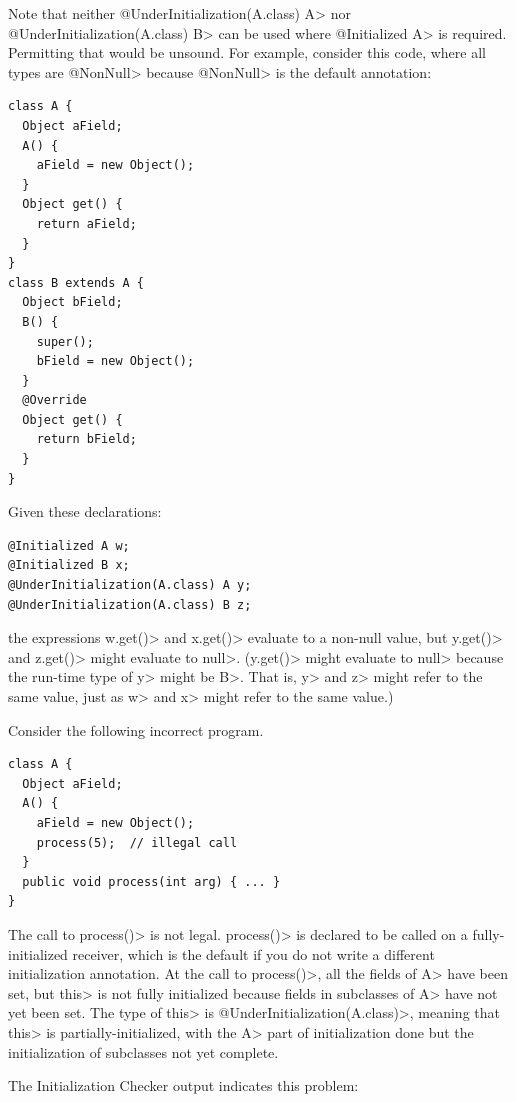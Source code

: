 Note that neither \<@UnderInitialization(A.class) A> nor
\<@UnderInitialization(A.class) B> can be used where \<@Initialized A> is
required.  Permitting that would be unsound.  For example, consider this
code, where all types are \<@NonNull> because \<@NonNull> is the default annotation:

\begin{Verbatim}
class A {
  Object aField;
  A() {
    aField = new Object();
  }
  Object get() {
    return aField;
  }
}
class B extends A {
  Object bField;
  B() {
    super();
    bField = new Object();
  }
  @Override
  Object get() {
    return bField;
  }
}
\end{Verbatim}

Given these declarations:

\begin{Verbatim}
@Initialized A w;
@Initialized B x;
@UnderInitialization(A.class) A y;
@UnderInitialization(A.class) B z;
\end{Verbatim}

\noindent
the expressions \<w.get()> and \<x.get()> evaluate to a non-null value, but
\<y.get()> and \<z.get()> might evaluate to \<null>.
(\<y.get()> might evaluate to \<null> because the run-time type of \<y>
might be \<B>.  That is, \<y> and \<z> might refer to the same value, just
as \<w> and \<x> might refer to the same value.)



Consider the following incorrect program.

\begin{Verbatim}
class A {
  Object aField;
  A() {
    aField = new Object();
    process(5);  // illegal call
  }
  public void process(int arg) { ... }
}
\end{Verbatim}

The call to \<process()> is not legal.
\<process()> is declared to be called on a fully-initialized receiver, which is
the default if you do not write a different initialization annotation.
At the call to \<process()>, all the fields of \<A> have been set,
but \<this> is not fully initialized because fields in subclasses of \<A> have
not yet been set.  The type of \<this> is \<@UnderInitialization(A.class)>,
meaning that \<this> is partially-initialized, with the \<A> part of
initialization done but the initialization of subclasses not yet complete.

The Initialization Checker output indicates this problem:

